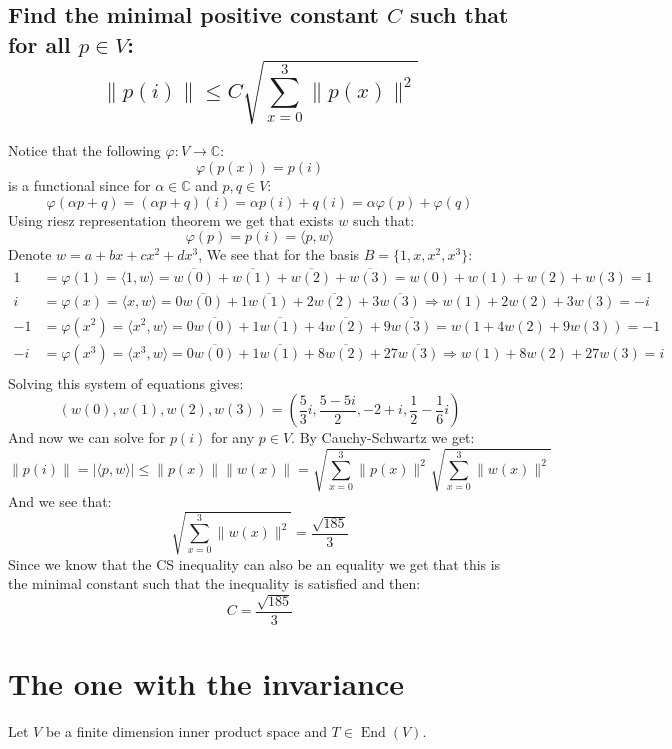 \documentclass[11pt,a4paper]{article}
\theoremstyle{plain}
\DeclareMathOperator{\End}{End}
\newcommand{\C}{\mathbb{C}}
\begin{document}
	\subsection{Find the minimal positive constant $C$ such that 
	for all $p\in V$:
	\[
	\| p(i) \| \le
	C\sqrt{\sum_{x=0}^{3}{\| p(x) \|^2}}
	\]}
	Notice that the following $\varphi \colon V \to \C$:
	\[
		\varphi(p(x)) = p(i)
	\]
	is a functional since for $\alpha\in\C$ and $p,q\in V$:
	\[
		\varphi(\alpha p + q) = (\alpha p + q)(i) = \alpha p(i) + q(i) = 
		\alpha \varphi(p) + \varphi(q)
	\]
	Using riesz representation theorem we get that exists $w$ such that:
	\[
		\varphi(p) = p(i) = \langle p, w\rangle
	\]
	Denote $w = a+bx+cx^2+dx^3$, 
	We see that for the basis $B = \{1,x,x^2,x^3\}$:
	\begin{align*}
		1 &= \varphi(1) = \langle 1, w\rangle = \overline{w(0)} + 
		\overline{w(1)} + \overline{w(2)} + \overline{w(3)} 
		= {w(0)} + {w(1)} + {w(2)} + {w(3)} = 1 \\
		i &= \varphi(x) = \langle x, w\rangle = 0\overline{w(0)} + 
		1\overline{w(1)} + 2\overline{w(2)} + 3\overline{w(3)} 
		\Rightarrow w(1)+2w(2)+3w(3) = -i \\
		-1 &= \varphi(x^2) = \langle x^2, w\rangle = 0\overline{w(0)} + 
		1\overline{w(1)} + 4\overline{w(2)} + 9\overline{w(3)} = 
		w(1 + 4w(2) + 9w(3)) = -1 \\
		-i &= \varphi(x^3) = \langle x^3, w\rangle = 0\overline{w(0)} + 
		1\overline{w(1)} + 8\overline{w(2)} + 27\overline{w(3)} \Rightarrow
		w(1) + 8w(2) + 27w(3) = i \\
	\end{align*}
	Solving this system of equations gives:
	\[
		(w(0),w(1),w(2),w(3)) = 
		\left(\frac{5}{3}i,\frac{5-5i}{2},-2+i,\frac{1}{2}-
		\frac{1}{6}i\right)
	\]
	And now we can solve for $p(i)$ for any $p\in V$. By Cauchy-Schwartz we get:
	\[
		\|p(i)\| = |\langle p,w\rangle| \le \|p(x)\|\|w(x)\| = 
		\sqrt{\sum_{x=0}^{3}{\| p(x) \|^2}} \sqrt{\sum_{x=0}^{3}{\| w(x) \|^2}}
	\]
	And we see that:
	\[
		\sqrt{\sum_{x=0}^{3}{\| w(x) \|^2}} = \frac{\sqrt{185}}{3}
	\]
	Since we know that the CS inequality can also be an equality we get that
	this is the minimal constant such that the inequality is satisfied and then:
	\[
		\boxed{C = \frac{\sqrt{185}}{3}}
	\]
	
	
	
	\newpage

	\section{The one with the invariance}
	Let $V$ be a finite dimension inner product space and $T\in\End(V)$. 
	
\end{document}
